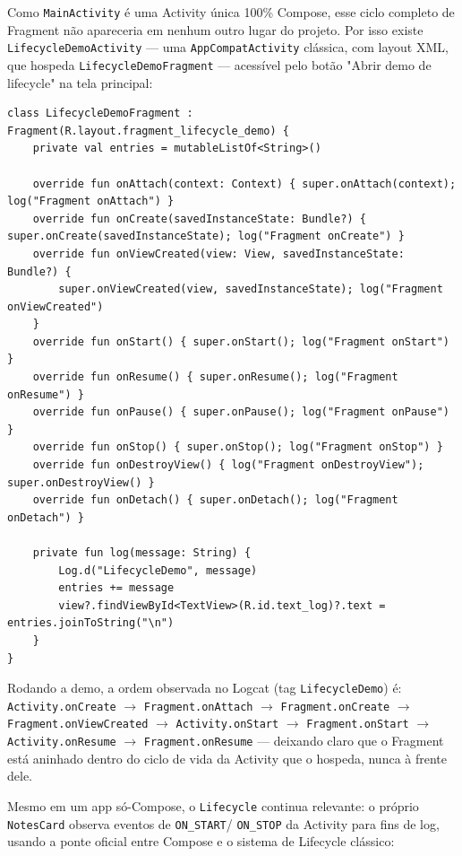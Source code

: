 \documentclass[11pt,a4paper]{article}
\begin{document}
Como \texttt{MainActivity} é uma Activity única 100\% Compose, esse
ciclo completo de Fragment não apareceria em nenhum outro lugar do
projeto. Por isso existe \texttt{LifecycleDemoActivity} — uma
\texttt{AppCompatActivity} clássica, com layout XML, que hospeda
\texttt{LifecycleDemoFragment} — acessível pelo botão "Abrir demo de
lifecycle" na tela principal:

\begin{lstlisting}[caption={Fragment: cada callback grava e reimprime o log na tela}, label=lst:lifecycle-fragment]
class LifecycleDemoFragment : Fragment(R.layout.fragment_lifecycle_demo) {
    private val entries = mutableListOf<String>()

    override fun onAttach(context: Context) { super.onAttach(context); log("Fragment onAttach") }
    override fun onCreate(savedInstanceState: Bundle?) { super.onCreate(savedInstanceState); log("Fragment onCreate") }
    override fun onViewCreated(view: View, savedInstanceState: Bundle?) {
        super.onViewCreated(view, savedInstanceState); log("Fragment onViewCreated")
    }
    override fun onStart() { super.onStart(); log("Fragment onStart") }
    override fun onResume() { super.onResume(); log("Fragment onResume") }
    override fun onPause() { super.onPause(); log("Fragment onPause") }
    override fun onStop() { super.onStop(); log("Fragment onStop") }
    override fun onDestroyView() { log("Fragment onDestroyView"); super.onDestroyView() }
    override fun onDetach() { super.onDetach(); log("Fragment onDetach") }

    private fun log(message: String) {
        Log.d("LifecycleDemo", message)
        entries += message
        view?.findViewById<TextView>(R.id.text_log)?.text = entries.joinToString("\n")
    }
}
\end{lstlisting}

Rodando a demo, a ordem observada no Logcat (tag \texttt{LifecycleDemo})
é: \texttt{Activity.onCreate} $\to$ \texttt{Fragment.onAttach} $\to$
\texttt{Fragment.onCreate} $\to$ \texttt{Fragment.onViewCreated} $\to$
\texttt{Activity.onStart} $\to$ \texttt{Fragment.onStart} $\to$
\texttt{Activity.onResume} $\to$ \texttt{Fragment.onResume} — deixando
claro que o Fragment está aninhado dentro do ciclo de vida da Activity
que o hospeda, nunca à frente dele.

Mesmo em um app só-Compose, o \texttt{Lifecycle} continua relevante: o
próprio \texttt{NotesCard} observa eventos de \texttt{ON\_START}/
\texttt{ON\_STOP} da Activity para fins de log, usando a ponte oficial
entre Compose e o sistema de Lifecycle clássico:
\end{document}
